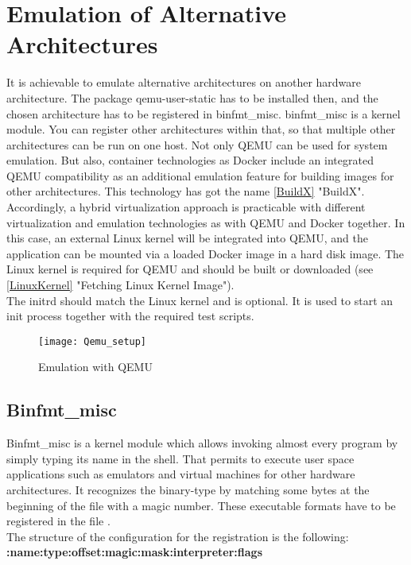 \section{Emulation of Alternative Architectures}\label{AlternativeArchitectures}

It is achievable to emulate alternative architectures on another hardware architecture. The package qemu-user-static has to be installed then, and the chosen architecture has to be registered in binfmt\_misc. binfmt\_misc is a kernel module. 
You can register other architectures within that, so that multiple other architectures can be run on one host. 
Not only \gls{QEMU} can be used for system emulation. But also, container technologies as Docker include an integrated \gls{QEMU} compatibility as an additional emulation feature for building images for other architectures. 
This technology has got the name \ref{BuildX} "BuildX". Accordingly, a hybrid virtualization approach is practicable with different virtualization and emulation technologies as with \gls{QEMU} and Docker together. In this case, an external Linux kernel will be integrated into \gls{QEMU}, and the application can be mounted via a loaded Docker image in a hard disk image. 
The Linux kernel is required for \gls{QEMU} and should be built or downloaded (see \ref{LinuxKernel} "Fetching Linux Kernel Image").\\
The initrd should match the Linux kernel and is optional. It is used to start an init process together with the required test scripts. \\

\begin{figure}[H]
\centering
\texttt{[image: Qemu\_setup]}
 \caption{Emulation with \gls{QEMU}}
    \label{\gls{QEMU}_Emulation}
\end{figure}


\newpage
\subsection{Binfmt\_misc} \label{Binfmt}

Binfmt\_misc is a kernel module which allows invoking almost every program by simply typing its name in the shell. That permits to execute user space applications such as emulators and virtual machines for other hardware architectures. It recognizes the binary-type by matching some bytes at the beginning of the file with a magic number. These executable formats have to be registered in the file .\\
The structure of the configuration for the registration is the following: \\ \textbf{:name:type:offset:magic:mask:interpreter:flags} 

